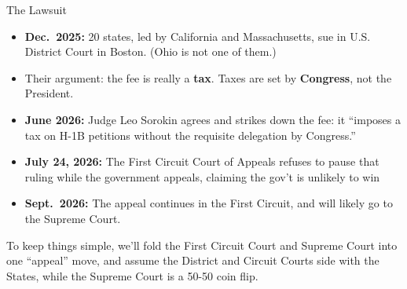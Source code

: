 \begin{frame}{The Lawsuit}
\begin{itemize}
    \item \textbf{Dec.\ 2025:} 20 states, led by California and Massachusetts, sue in U.S. District Court in Boston. (Ohio is not one of them.)
    \item Their argument: the fee is really a \textbf{tax}. Taxes are set by \textbf{Congress}, not the President.
    \item \textbf{June 2026:} Judge Leo Sorokin agrees and strikes down the fee: it ``imposes a tax on H-1B petitions without the requisite delegation by Congress.''
    \item \textbf{July 24, 2026:} The First Circuit Court of Appeals refuses to pause that ruling
      while the government appeals, claiming the gov't is unlikely to win
    \item \textbf{Sept.\ 2026:} The appeal continues in the First Circuit, and will likely go to the Supreme Court.
\end{itemize}
\vfill
\small
To keep things simple, we'll fold the First Circuit Court and Supreme Court into one ``appeal'' move, and assume the District and Circuit Courts side with the States, while the Supreme Court is a 50-50 coin flip.
\vspace{-0.2in}
\end{frame}

